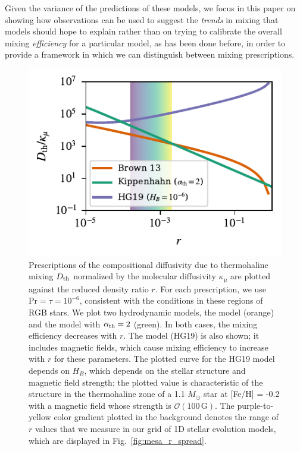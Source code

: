 Given the variance of the predictions of these models, we focus in this paper on showing how observations can be used to suggest the \textit{trends} in mixing that models should hope to explain rather than on trying to calibrate the overall mixing \textit{efficiency} for a particular model, as has been done before, in order to provide a framework in which we can distinguish between mixing prescriptions.


\begin{figure}
    \centering
    \includegraphics[width=\columnwidth]{Nu_models_comparison.pdf}
    \caption{ 
    Prescriptions of the compositional diffusivity due to thermohaline mixing $D_{\rm th}$ normalized by the molecular diffusivity $\kappa_{\mu}$ are plotted against the reduced density ratio $r$. For each prescription, we use $\mathrm{Pr} = \tau = 10^{-6}$, consistent with the conditions in these regions of RGB stars.
    We plot two hydrodynamic models, the \citet{brown_etal_2013} model (orange) and the \citet{kippenhahn_etal_1980} model with $\alpha_{\rm th} = 2$ (green). In both cases, the mixing efficiency decreases with $r$.
    The \citet{harrington} model (HG19) is also shown; it includes magnetic fields, which cause mixing efficiency to increase with $r$ for these parameters.
    The plotted curve for the HG19 model depends on $H_B$, which depends on the stellar structure and magnetic field strength; the plotted value is characteristic of the structure in the thermohaline zone of a 1.1 $M_\odot$ star at [Fe/H] = -0.2 with a magnetic field whose strength is $\mathcal{O}(100 \,\mathrm{G})$.
    The purple-to-yellow color gradient plotted in the background denotes the range of $r$ values that we measure in our grid of 1D stellar evolution models, which are displayed in Fig.~\ref{fig:mesa_r_spread}.
    }
    \label{fig:parameterization_compare}
\end{figure}
